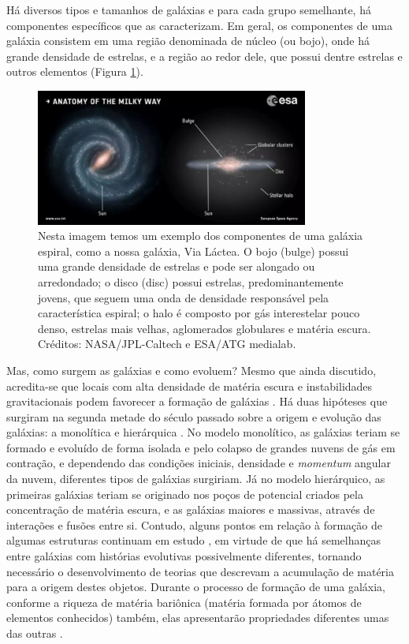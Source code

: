 Há diversos tipos e tamanhos de galáxias e para cada grupo semelhante, há componentes específicos que as caracterizam. Em geral, os componentes de uma galáxia consistem em uma região denominada de núcleo (ou bojo), onde há grande densidade de estrelas, e a região ao redor dele, que possui dentre estrelas e outros elementos (Figura \ref{fig:esa_estrutura_galaxia}).

\begin{figure}[!h]
  \centering 
  \includegraphics[width=0.8\textwidth]{Imagens/esa_estrutura_galaxia.PNG} 
  \caption[Componentes de uma galáxia espiral.]{Nesta imagem temos um exemplo dos componentes de uma galáxia espiral, como a nossa galáxia, Via Láctea. O bojo (bulge) possui uma grande densidade de estrelas e pode ser alongado ou arredondado; o disco (disc) possui estrelas, predominantemente jovens, que seguem uma onda de densidade responsável pela característica espiral; o halo é composto por gás interestelar pouco denso, estrelas mais velhas, aglomerados globulares e matéria escura. Créditos: NASA/JPL-Caltech e ESA/ATG medialab.} 
  \label{fig:esa_estrutura_galaxia} 
\end{figure}

Mas, como surgem as galáxias e como evoluem? Mesmo que ainda discutido, acredita-se que locais com alta densidade de matéria escura e instabilidades gravitacionais podem favorecer a formação de galáxias \cite{2018sm}. Há duas hipóteses que surgiram na segunda metade do século passado sobre a origem e evolução das galáxias: a monolítica e hierárquica \cite{2022gastao}. No modelo monolítico, as galáxias teriam se formado e evoluído de forma isolada e pelo colapso de grandes nuvens de gás em contração, e dependendo das condições iniciais, densidade e \emph{momentum} angular da nuvem, diferentes tipos de galáxias surgiriam. Já no modelo hierárquico, as primeiras galáxias teriam se originado nos poços de potencial criados pela concentração de matéria escura, e as galáxias maiores e massivas, através de interações e fusões entre si. Contudo, alguns pontos em relação à formação de algumas estruturas continuam em estudo \cite{2018sm}, em virtude de que há semelhanças entre galáxias com histórias evolutivas possivelmente diferentes, tornando necessário o desenvolvimento de teorias que descrevam a acumulação de matéria para a origem destes objetos. Durante o processo de formação de uma galáxia, conforme a riqueza de matéria bariônica (matéria formada por átomos de elementos conhecidos) também, elas apresentarão propriedades diferentes umas das outras \cite{2018cdf}. 

